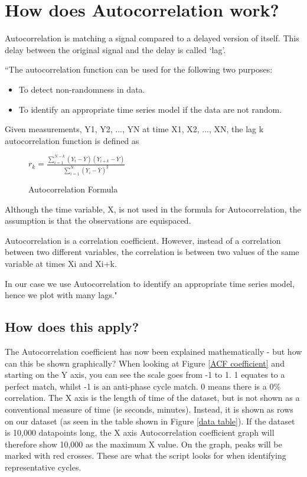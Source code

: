\section{How does Autocorrelation work?}
Autocorrelation is matching a signal compared to a delayed version of itself. This delay between the original signal and the delay is called ‘lag'. 

``The autocorrelation \cite{Jenkins} function can be used for the following two purposes:

\begin{itemize}

    \item To detect non-randomness in data.
    
    \item To identify an appropriate time series model if the data are not random.
    
\end{itemize}

Given measurements, Y1, Y2, ..., YN at time X1, X2, ..., XN, the lag k autocorrelation function is defined as
\begin{figure}
\centering

\begin{math}
{ {r_{k} = \frac{\sum_{i=1}^{N-k}(Y_{i} - \bar{Y})(Y_{i+k} -  \bar{Y})} {\sum_{i=1}^{N}(Y_{i} - \bar{Y})^{2} }} }
\end{math}

\caption{Autocorrelation Formula}
\label{autocorrolationF}
\end{figure}

Although the time variable, X, is not used in the formula for Autocorrelation, the assumption is that the observations are equispaced.

Autocorrelation is a correlation coefficient. However, instead of a correlation between two different variables, the correlation is between two values of the same variable at times Xi and Xi+k.

In our case we use Autocorrelation to identify an appropriate time series model, hence we plot with many lags." \cite{NIST}

\subsection{How does this apply?}

The Autocorrelation coefficient has now been explained mathematically - but how can this be shown graphically? When looking at Figure \ref{ACF coefficient} and starting on the Y axis, you can see the scale goes from -1 to 1. 1 equates to a perfect match, whilst -1 is an anti-phase cycle match. 0 means there is a 0\% correlation. The X axis is the length of time of the dataset, but is not shown as a conventional measure of time (ie seconds, minutes). Instead, it is shown as rows on our dataset (as seen in the table shown in Figure \ref{data table}). If the dataset is 10,000 datapoints long, the X axis Autocorrelation coefficient graph will therefore show 10,000 as the maximum X value.  On the graph, peaks will be marked with red crosses. These are what the script looks for when identifying representative cycles.

